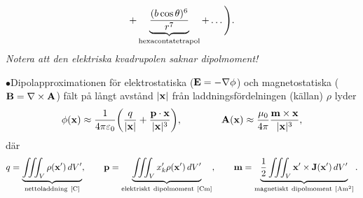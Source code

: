 {{{{{{$$         +\underbrace{{{(b\cos\theta)^6}\over{r^7}}}_{\rm hexacontatetrapol}
         +\ldots
        \Bigg).
  $$
  {\it Notera att den elektriska kvadrupolen saknar dipolmoment!}}
\item{$\bullet$}{Dipolapproximationen f{\"o}r elektrostatiska
  (${\bf E}=-\nabla\phi$) och magnetostatiska (${\bf B}=\nabla\times{\bf A}$)
  f{\"a}lt p{\aa} l{\aa}ngt avst{\aa}nd $|{\bf x}|$ fr{\aa}n
  laddningsf{\"o}rdelningen (k{\"a}llan) $\rho$ lyder
  $$
    \phi({\bf x})\approx{{1}\over{4\pi\varepsilon_0}}\bigg(
        {{q}\over{|{\bf x}|}} + {{{\bf p}\cdot{\bf x}}\over{|{\bf x}|^3}}
      \bigg),\qquad\qquad
    {\bf A}({\bf x})\approx{{\mu_0}\over{4\pi}}
        {{{\bf m}\times{\bf x}}\over{|{\bf x}|^3}},
  $$
  d{\"a}r
  $$
    q=\underbrace{
        \iiint_{V} \rho({\bf x}')\,dV'
      }_{{\rm nettoladdning}\ [{\rm C}]},\qquad
    {\bf p}=\underbrace{
        \iiint_{V} x'_k \rho({\bf x}')\,dV'
      }_{{\rm elektriskt\ dipolmoment}\ [{\rm C}{\rm m}]},\qquad
    {\bf m}=\underbrace{
        {{1}\over{2}}\iiint_{V} {\bf x}'\times{\bf J}({\bf x}')\,dV'
      }_{{\rm magnetiskt\ dipolmoment}\ [{\rm A}{\rm m}^2]}.
  $$}

}}}}}

